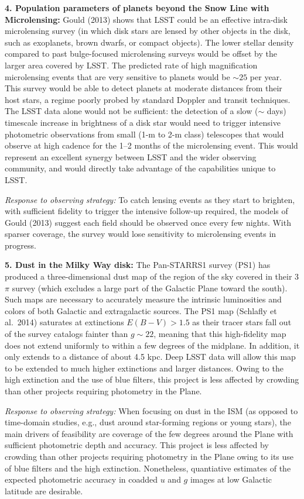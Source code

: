 {\bf 4. Population parameters of planets beyond the Snow Line with Microlensing:} Gould
(2013) shows that LSST could be an effective intra-disk microlensing
survey (in which disk stars are lensed by other objects in the disk,
such as exoplanets, brown dwarfs, or compact objects). The lower
stellar density compared to past bulge-focused microlensing surveys
would be offset by the larger area covered by LSST. The predicted rate
of high magnification microlensing events that are very sensitive to
planets would be $\sim 25$ per year. This survey would be able to
detect planets at moderate distances from their host stars, a regime
poorly probed by standard Doppler and transit techniques. The LSST
data alone would not be sufficient: the detection of a slow ($\sim$
days) timescale increase in brightness of a disk star would need to
trigger intensive photometric observations from small (1-m to 2-m
class) telescopes that would observe at high cadence for the 1--2
months of the microlensing event. This would represent an excellent
synergy between LSST and the wider observing community, and would
directly take advantage of the capabilities unique to LSST.

{\it Response to observing strategy:} To catch lensing events as they
start to brighten, with sufficient fidelity to trigger the intensive
follow-up required, the models of Gould (2013) suggest each field
should be observed once every few nights. With sparser coverage,
the survey would lose sensitivity to microlensing events in progress.

{\bf 5. Dust in the Milky Way disk:} The Pan-STARRS1 survey (PS1) has
produced a three-dimensional dust map of the region of the sky covered
in their 3$\pi$ survey (which excludes a large part of the Galactic
Plane toward the south). Such maps are necessary to accurately measure
the intrinsic luminosities and colors of both Galactic and
extragalactic sources. The PS1 map (Schlafly et al.~2014) saturates at
extinctions $E(B-V) > 1.5$ as their tracer stars fall out of the
survey catalogs fainter than $g\sim 22$, meaning that this
high-fidelity map does not extend uniformly to within a few degrees of
the midplane. In addition, it only extends to a distance of about 4.5
kpc. Deep LSST data will allow this map to be extended to much higher
extinctions and larger distances. Owing to the high extinction and the
use of blue filters, this project is less affected by crowding than
other projects requiring photometry in the Plane. 

{\it Response to observing strategy:} When focusing on dust in the ISM (as
opposed to time-domain studies, e.g., dust around star-forming
regions or young stars), the main drivers of feasibility are
coverage of the few degrees around the Plane with sufficient photometric depth
and accuracy. This project is less affected by crowding than other
projects requiring photometry in the Plane owing to its use of blue
filters and the high extinction.  Nonetheless, quantiative estimates of
the expected photometric accuracy in coadded $u$ and $g$ images at low
Galactic latitude are desirable.


